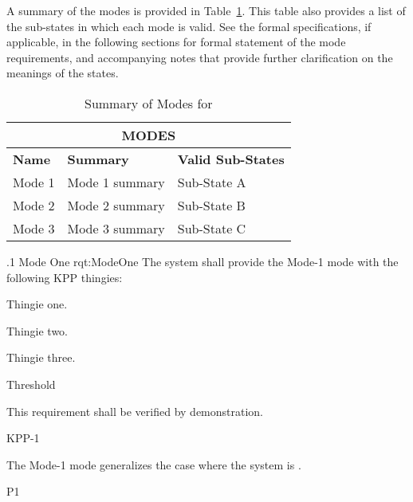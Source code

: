 
A summary of the modes is provided in Table~\ref{tab:Modes}.
This table also provides a list of the sub-states in which each mode is valid.
See the formal specifications, if applicable, in the following sections for formal statement of the mode requirements, and accompanying notes that provide further clarification on the meanings of the states.
\begin{table}[htbp]
	\begin{center}
		\begin{tabular}{|p{1.0in}|p{4.0in}|p{1.0in}|}
			\hline
			\hline
			     \multicolumn{3}{|c|}{{\bf MODES}}\\
			\hline
{\bf Name} & {\bf Summary}	& {\bf Valid Sub-States}\\
			\hline
			\hline
Mode 1 & Mode 1 summary & Sub-State A\\ \hline
Mode 2 & Mode 2 summary & Sub-State B\\ \hline
Mode 3 & Mode 3 summary & Sub-State C\\ 
			\hline
			\hline
			\end{tabular}
				\caption{Summary of Modes for \ThisSystem}
				\label{tab:Modes}
		\end{center}
\end{table}


\MULTIRQMTVKPP
{\RqtNumberBase.1}
{Mode One}
{rqt:ModeOne}
{The system shall provide the Mode-1 mode with the following KPP thingies:}
{
	\item Thingie one.
	\item Thingie two.
	\item Thingie three.
}
{
	\item [Phase 1] Threshold
}
{This requirement shall be verified by demonstration.}
{
	\item [\cite{ref__KNEAD_Manual}] KPP-1
}
{
	\item The Mode-1 mode generalizes the case where the system is \TBD.
}
{P1}


